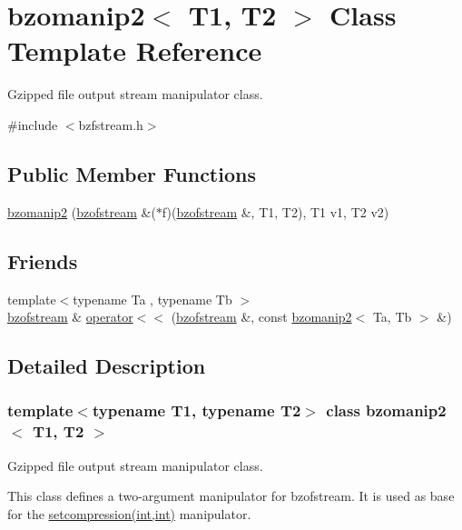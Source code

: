 \hypertarget{classbzomanip2}{}\section{bzomanip2$<$ T1, T2 $>$ Class Template Reference}
\label{classbzomanip2}


Gzipped file output stream manipulator class.  




{\ttfamily \#include $<$bzfstream.\+h$>$}

\subsection*{Public Member Functions}
\begin{DoxyCompactItemize}
\item 
\hyperlink{classbzomanip2_a7ae5b761a865198f14c3ea23d4a2b15c}{bzomanip2} (\hyperlink{classbzofstream}{bzofstream} \&($\ast$f)(\hyperlink{classbzofstream}{bzofstream} \&, T1, T2), T1 v1, T2 v2)
\end{DoxyCompactItemize}
\subsection*{Friends}
\begin{DoxyCompactItemize}
\item 
{\footnotesize template$<$typename Ta , typename Tb $>$ }\\\hyperlink{classbzofstream}{bzofstream} \& \hyperlink{classbzomanip2_a7989b7dd1feaec2c5aebabd6af749f9e}{operator$<$$<$} (\hyperlink{classbzofstream}{bzofstream} \&, const \hyperlink{classbzomanip2}{bzomanip2}$<$ Ta, Tb $>$ \&)
\end{DoxyCompactItemize}


\subsection{Detailed Description}
\subsubsection*{template$<$typename T1, typename T2$>$\newline
class bzomanip2$<$ T1, T2 $>$}

Gzipped file output stream manipulator class. 

This class defines a two-\/argument manipulator for bzofstream. It is used as base for the \hyperlink{zfstream_8h_a9faf10ab9ba2398c393ad3691421c180}{setcompression(int,int)} manipulator. 

